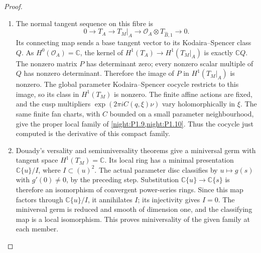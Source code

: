 \documentclass[11pt,a4paper]{article}
\theoremstyle{definition}
\begin{document}
\begin{proof}
\begin{enumerate}[label=\arabic*.]
\item The normal tangent sequence on this fibre is
\[
0\longrightarrow T_A\longrightarrow T_M|_A
\longrightarrow\mathcal O_A\otimes T_{\widehat B,1}
\longrightarrow0.
\]
Its connecting map sends a base tangent vector to its
Kodaira--Spencer class $Q$.  As $H^0(\mathcal O_A)=\mathbb C$,
the kernel of $H^1(T_A)\to H^1(T_M|_A)$ is exactly
$\mathbb C Q$.  The nonzero matrix $P$ has determinant zero;
every nonzero scalar multiple of $Q$ has nonzero determinant.
Therefore the image of $P$ in $H^1(T_M|_A)$ is nonzero.
The global parameter Kodaira--Spencer cocycle restricts to this
image, so its class in $H^1(T_M)$ is nonzero.
The finite affine actions are fixed, and the cusp multipliers
$\exp(2\pi iC(q,\xi)\nu)$ vary holomorphically in $\xi$.
The same finite fan charts, with $C$ bounded on a small parameter
neighbourhood, give the proper local family of
\cref{night:P1.9,night:P1.10}.  Thus the cocycle just computed is
the derivative of this compact family.

\item Douady's versality and semiuniversality theorems
\cite[\S VII.8, pp.~598--599; \S VIII.1, pp.~599--600]{Douady1974}
give a miniversal germ with tangent space $H^1(T_M)=\mathbb C$.
Its local ring has a minimal presentation $\mathbb C\{u\}/I$,
where $I\subset(u)^2$.  The actual parameter disc classifies by
$u\mapsto g(s)$ with $g'(0)\ne0$, by the preceding step.
Substitution $\mathbb C\{u\}\to\mathbb C\{s\}$ is therefore an
isomorphism of convergent power-series rings.  Since this map factors
through $\mathbb C\{u\}/I$, it annihilates $I$; its injectivity
gives $I=0$.  The miniversal germ is reduced and smooth of dimension
one, and the classifying map is a local isomorphism.  This proves
miniversality of the given family at each member.
\end{enumerate}
\end{proof}
\end{document}
